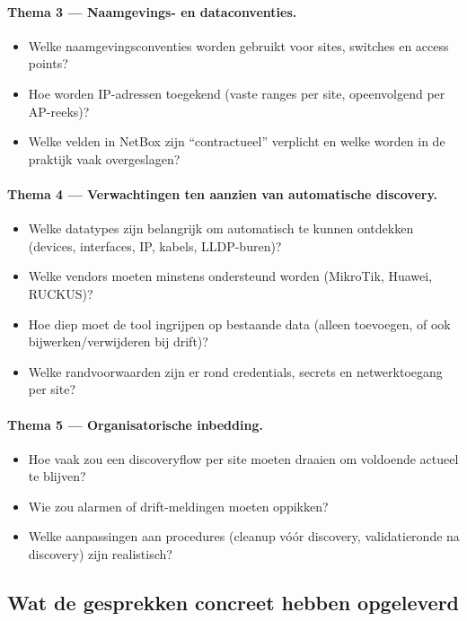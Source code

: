 \paragraph{Thema 3 --- Naamgevings- en data\-conventies.}
\begin{itemize}
  \item Welke naamgevingsconventies worden gebruikt voor sites, switches en access points?
  \item Hoe worden IP-adressen toegekend (vaste ranges per site, opeenvolgend per AP-reeks)?
  \item Welke velden in NetBox zijn ``contractueel'' verplicht en welke worden in de praktijk vaak overgeslagen?
\end{itemize}

\paragraph{Thema 4 --- Verwachtingen ten aanzien van automatische discovery.}
\begin{itemize}
  \item Welke datatypes zijn belangrijk om automatisch te kunnen ontdekken (devices, interfaces, IP, kabels, LLDP-buren)?
  \item Welke vendors moeten minstens ondersteund worden (MikroTik, Huawei, RUCKUS)?
  \item Hoe diep moet de tool ingrijpen op bestaande data (alleen toevoegen, of ook bijwerken/verwijderen bij drift)?
  \item Welke randvoorwaarden zijn er rond credentials, secrets en netwerktoegang per site?
\end{itemize}

\paragraph{Thema 5 --- Organisatorische inbedding.}
\begin{itemize}
  \item Hoe vaak zou een discoveryflow per site moeten draaien om voldoende actueel te blijven?
  \item Wie zou alarmen of drift-meldingen moeten oppikken?
  \item Welke aanpassingen aan procedures (cleanup vóór discovery, validatieronde na discovery) zijn realistisch?
\end{itemize}

\subsection{Wat de gesprekken concreet hebben opgeleverd}

